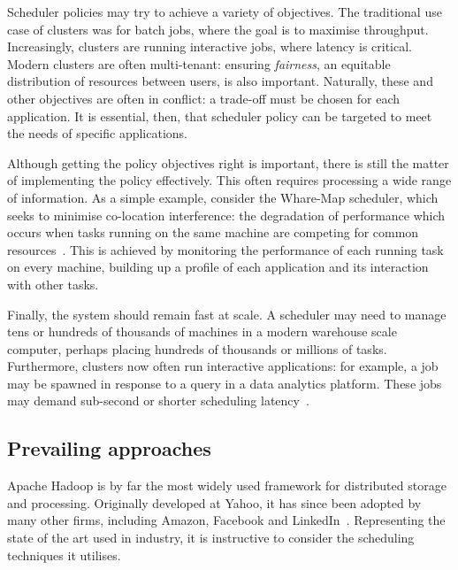 Scheduler policies may try to achieve a variety of objectives. The traditional use case of clusters was for batch jobs, where the goal is to maximise throughput. Increasingly, clusters are running interactive jobs, where latency is critical. Modern clusters are often multi-tenant: ensuring \emph{fairness}, an equitable distribution of resources between users, is also important. Naturally, these and other objectives are often in conflict: a trade-off must be chosen for each application. It is essential, then, that scheduler policy can be targeted to meet the needs of specific applications.

Although getting the policy objectives right is important, there is still the matter of implementing the policy effectively. This often requires processing a wide range of information. As a simple example, consider the Whare-Map scheduler, which seeks to minimise co-location interference: the degradation of performance which occurs when tasks running on the same machine are competing for common resources~\cite{Mars:2013}\footnotemark. This is achieved by monitoring the performance of each running task on every machine, building up a profile of each application and its interaction with other tasks.

Finally, the system should remain fast at scale. A scheduler may need to manage tens or hundreds of thousands of machines in a modern warehouse scale computer, perhaps placing hundreds of thousands or millions of tasks\footnotemark. Furthermore, clusters now often run interactive applications: for example, a job may be spawned in response to a query in a data analytics platform. These jobs may demand sub-second or shorter scheduling latency~\cite{Ousterhout:2013}.

\subsection{Prevailing approaches}

Apache Hadoop is by far the most widely used framework for distributed storage and processing. Originally developed at Yahoo, it has since been adopted by many other firms, including Amazon, Facebook and LinkedIn~\cite{HadoopPoweredBy}. Representing the state of the art used in industry, it is instructive to consider the scheduling techniques it utilises. 

